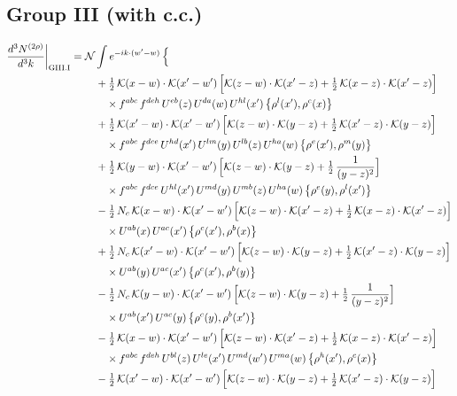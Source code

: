 \documentclass[10pt]{article}
\numberwithin{equation}{section}
\newcommand{\KK}{\mathcal K}
\newcommand{\NN}{\mathcal N}
\begin{document}
\subsection*{Group III (with c.c.)}
\begin{align}
\frac{d^3N^{(2\rho)}}{d^3k}\bigg|_{\rm GIII.I}={}&\NN\int e^{-ik\cdot(w'-w)}\,\Big\{\notag\\
&\quad +\tfrac12\,\KK(x-w)\cdot\KK(x'-w')\,\Big[\KK(z-w)\cdot\KK(x'-z)+\tfrac12\,\KK(x-z)\cdot\KK(x'-z)\Big]\notag\\
&\qquad\times f^{abc}\,f^{deh}\,U^{eb}(z)\,U^{da}(w)\,U^{hl}(x')\,\big\{\rho^{l}(x'),\rho^{c}(x)\big\}\notag\\
&\quad +\tfrac12\,\KK(x'-w)\cdot\KK(x'-w')\,\Big[\KK(z-w)\cdot\KK(y-z)+\tfrac12\,\KK(x'-z)\cdot\KK(y-z)\Big]\notag\\
&\qquad\times f^{abc}\,f^{dce}\,U^{hd}(x')\,U^{lm}(y)\,U^{lb}(z)\,U^{ha}(w)\,\big\{\rho^{e}(x'),\rho^{m}(y)\big\}\notag\\
&\quad +\tfrac12\,\KK(y-w)\cdot\KK(x'-w')\,\Big[\KK(z-w)\cdot\KK(y-z)+\tfrac12\,\frac{1}{(y-z)^2}\Big]\notag\\
&\qquad\times f^{abc}\,f^{dce}\,U^{hl}(x')\,U^{md}(y)\,U^{mb}(z)\,U^{ha}(w)\,\big\{\rho^{e}(y),\rho^{l}(x')\big\}\notag\\
&\quad -\tfrac12\,N_{c}\,\KK(x-w)\cdot\KK(x'-w')\,\Big[\KK(z-w)\cdot\KK(x'-z)+\tfrac12\,\KK(x-z)\cdot\KK(x'-z)\Big]\notag\\
&\qquad\times U^{ab}(x)\,U^{ac}(x')\,\big\{\rho^{c}(x'),\rho^{b}(x)\big\}\notag\\
&\quad +\tfrac12\,N_{c}\,\KK(x'-w)\cdot\KK(x'-w')\,\Big[\KK(z-w)\cdot\KK(y-z)+\tfrac12\,\KK(x'-z)\cdot\KK(y-z)\Big]\notag\\
&\qquad\times U^{ab}(y)\,U^{ac}(x')\,\big\{\rho^{c}(x'),\rho^{b}(y)\big\}\notag\\
&\quad -\tfrac12\,N_{c}\,\KK(y-w)\cdot\KK(x'-w')\,\Big[\KK(z-w)\cdot\KK(y-z)+\tfrac12\,\frac{1}{(y-z)^2}\Big]\notag\\
&\qquad\times U^{ab}(x')\,U^{ac}(y)\,\big\{\rho^{c}(y),\rho^{b}(x')\big\}\notag\\
&\quad -\tfrac12\,\KK(x-w)\cdot\KK(x'-w')\,\Big[\KK(z-w)\cdot\KK(x'-z)+\tfrac12\,\KK(x-z)\cdot\KK(x'-z)\Big]\notag\\
&\qquad\times f^{abc}\,f^{deh}\,U^{bl}(z)\,U^{le}(x')\,U^{md}(w')\,U^{ma}(w)\,\big\{\rho^{h}(x'),\rho^{c}(x)\big\}\notag\\
&\quad -\tfrac12\,\KK(x'-w)\cdot\KK(x'-w')\,\Big[\KK(z-w)\cdot\KK(y-z)+\tfrac12\,\KK(x'-z)\cdot\KK(y-z)\Big]\notag\\

\end{align}
\end{document}

